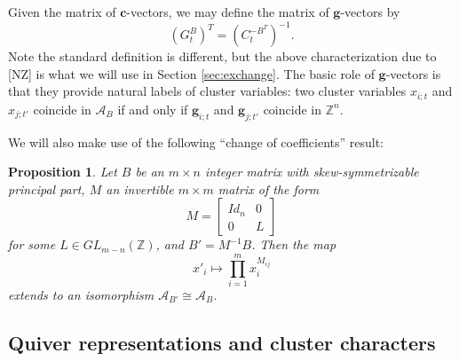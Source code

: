 \documentclass[12pt]{amsart}
\newcommand{\sayDR}[1]{\say[DR]{\color{red}{\bf DR:}\;#1}}
\newcommand{\cA}{\mathcal{A}}
\newcommand{\ZZ}{\mathbb{Z}}
\newcommand{\bfc}{\mathbf{c}}
\newcommand{\bfg}{\mathbf{g}}
\newtheorem{proposition}[theorem]{Proposition}
\theoremstyle{remark}
\numberwithin{equation}{section}
\begin{document}
Given the matrix of $\bfc$-vectors, we may define the matrix of $\bfg$-vectors by
\[
  (G_t^B)^T = (C_t^{-B^T})^{-1}.
\]
Note the standard definition is different, but the above characterization due to [NZ] is what we will use in Section \ref{sec:exchange}. The basic role of $\bfg$-vectors is that they provide natural labels of cluster variables: two cluster variables $x_{i;t}$ and $x_{j;t'}$ coincide in $\cA_B$ if and only if $\bfg_{i;t}$ and $\bfg_{j;t'}$ coincide in $\ZZ^n$.


We will also make use of the following ``change of coefficients'' result:

\begin{proposition}\label{prop:changeofcoeffs}
Let $B$ be an $m \times n$ integer matrix with skew-symmetrizable principal part, $M$ an invertible $m \times m$ matrix of the form 
\[
M = \begin{bmatrix} Id_n & 0 \\ 0 & L \end{bmatrix}
\]
for some $L\in GL_{m-n}(\ZZ)$, 
and $B' = M^{-1}B$. Then the map 
\[
x'_i \mapsto \prod_{i=1}^m x_i^{M_{ij}}
\]
extends to an isomorphism $\cA_{B'} \cong \cA_B$.
\end{proposition}

\subsection{Quiver representations and cluster characters}
\end{document}
